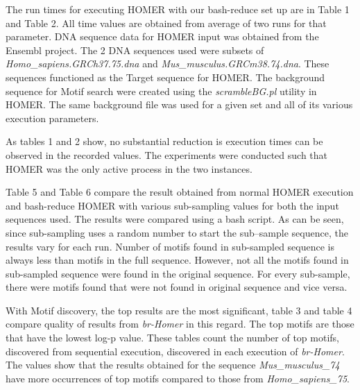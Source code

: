 \documentclass{acm_proc_article-sp}
\begin{document}
The run times for executing HOMER with our bash-reduce set up are in Table 1 and Table 2. All time values are obtained from average of two runs for that parameter. DNA sequence data for HOMER input was obtained from the Ensembl project. The 2 DNA sequences used were subsets of  \textit{Homo\_sapiens\-.GRCh37.75.dna} and  \textit{Mus\_musculus\-.GRCm38.74.dna}. These sequences functioned as the Target sequence for HOMER. The background sequence for Motif search were created using the \textit{scrambleBG.pl} utility in HOMER. The same background file was used for a given set and all of its various execution parameters.

As tables 1 and 2 show, no substantial reduction is execution times can be observed in the recorded values. The experiments were conducted such that HOMER was the only active process in the two instances. 

Table 5 and Table 6 compare the result obtained from normal HOMER execution and bash-reduce HOMER with various sub-sampling values for both the input sequences used. The results were compared using a bash script. As can be seen, since sub-sampling uses a random number to start the sub--sample sequence, the results vary for each run. Number of motifs found in sub-sampled sequence is always less than motifs in the full sequence. However, not all the motifs found in sub-sampled sequence were found in the original sequence. For every sub-sample, there were motifs found that were not found in original sequence and vice versa.

With Motif discovery, the top results are the most significant, table 3 and table 4 compare quality of results from \textit{br-Homer} in this regard. The top motifs are those that have the lowest log-p value.  These tables count the number of top motifs, discovered from sequential execution, discovered in each execution of \textit{br-Homer}. The values show that the results obtained for the sequence \textit{Mus\_musculus\_74} have more occurrences of top motifs compared to those from \textit{Homo\_sapiens\_75}.
\end{document}
